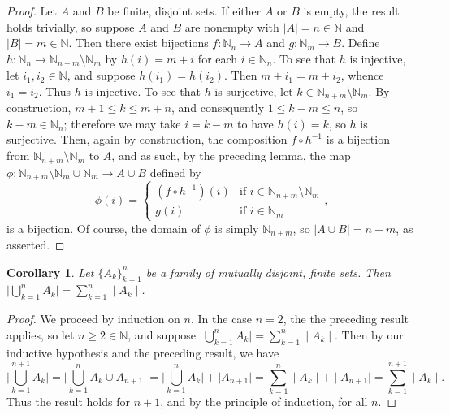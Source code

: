 \documentclass[12pt]{article}
\theoremstyle{plain}
\newtheorem*{cor}{Corollary}
\begin{document}
\begin{proof}
Let $A$ and $B$ be finite, disjoint sets.
If either $A$ or $B$ is empty, the result holds trivially, so suppose $A$ and $B$ are nonempty with $\mid A\mid=n\in\mathbb{N}$ and $\mid B\mid=m\in\mathbb{N}$. Then there exist bijections $f:\mathbb{N}_n\rightarrow A$ and $g:\mathbb{N}_m\rightarrow B$. Define $h:\mathbb{N}_n\rightarrow \mathbb{N}_{n+m}\setminus\mathbb{N}_m$ by $h(i)=m+i$ for each $i\in\mathbb{N}_n$. To see that $h$ is injective, let $i_1,i_2\in\mathbb{N}$, and suppose $h(i_1)=h(i_2)$. Then $m+i_1=m+i_2$, whence $i_1=i_2$. Thus $h$ is injective. To see that $h$ is surjective, let $k\in\mathbb{N}_{n+m}\setminus\mathbb{N}_m$. By construction, $m+1\leq k\leq m+n$, and consequently $1\leq k-m\leq n$, so $k-m\in\mathbb{N}_n$; therefore we may take $i=k-m$ to have $h(i)=k$, so $h$ is surjective. Then, again by construction, the composition $f\circ h^{-1}$ is a bijection from $\mathbb{N}_{n+m}\setminus\mathbb{N}_m$ to $A$, and as such, by the preceding lemma, the map $\phi:\mathbb{N}_{n+m}\setminus\mathbb{N}_m\cup\mathbb{N}_m\rightarrow A\cup B$ defined by 
\begin{equation}
\phi(i)=
\begin{cases}
(f\circ h^{-1})(i)&\text{if }i\in\mathbb{N}_{n+m}\setminus\mathbb{N}_m\\
g(i)&\text{if }i\in\mathbb{N}_m
\end{cases}\text{,}
\end{equation}
is a bijection. Of course, the domain of $\phi$ is simply $\mathbb{N}_{n+m}$, so $\mid A\cup B\mid=n+m$, as asserted.
\end{proof}
\begin{cor}
Let $\{A_k\}_{k=1}^n$ be a family of mutually disjoint, finite sets. Then $\mid\bigcup_{k=1}^nA_k\mid=\sum_{k=1}^n\mid A_k\mid$. 
\end{cor}
\begin{proof}
We proceed by induction on $n$. In the case $n=2$, the the preceding result applies, so let $n\geq 2\in\mathbb{N}$, and suppose 
$\mid\bigcup_{k=1}^nA_k\mid=\sum_{k=1}^n\mid A_k\mid$. Then by our inductive hypothesis and the preceding result, we have
\begin{equation}
\bigg\vert\bigcup_{k=1}^{n+1}A_k\bigg\vert=\bigg\vert\bigcup_{k=1}^nA_k\cup A_{n+1}\bigg\vert
=\bigg\vert\bigcup_{k=1}^nA_k\bigg\vert+\mid A_{n+1}\mid
=\sum_{k=1}^n\mid A_k\mid+\mid A_{n+1}\mid=\sum_{k=1}^{n+1}\mid A_k\mid\text{.}
\end{equation}
Thus the result holds for $n+1$, and by the principle of induction, for all $n$. 
\end{proof}






\end{document}
